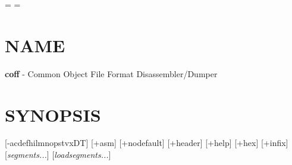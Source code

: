 \def\headnote#1{\setbox0=\hbox{\bf #1\enspace}
                \hangindent\parindent
                \advance\hangindent by 5pc
                \advance\hangindent by\wd0
                \indent\hbox to5pc{\hfil}\box0}
\def\body#1#2{\setbox0=\hbox to6pc{\omf #1\hfil}
                \setbox1=\hbox to5pc{#2\hfil}
                \hangindent\parindent
                \advance\hangindent by 11pc
                \indent\box0\box1}
\def\bodybody{\hangindent\parindent
                \advance\hangindent by 11pc
                \indent\hbox to11pc{\hfil}}
\def\bodynote#1{\setbox0=\hbox{\bf #1\enspace}
                \hangindent\parindent
                \advance\hangindent by 11pc
                \advance\hangindent by\wd0
                \indent\hbox to11pc{\hfil}\box0}
\def\beginsample{\begingroup
                \obeylines\obeyspaces
                \parskip=0pt\baselineskip=10pt\sample
                \catcode`\$=11  %
                \catcode`\_=11  %
                \catcode`\#=11  %
                \catcode`\~=11}
\def\endsample{\catcode`\$=3    %
                \catcode`\_=8   %
                \catcode`\#=6   %
                \catcode`\~=\active %
                \endgroup}

%
\headline={}
\footline={\vbox{\vskip4pc
                }}
\topskip=4pc
\vsize=8.6in

%
\rm\bigskip\bigskip

\section{NAME}

{\bf coff} - Common Object File Format Disassembler/Dumper

\bigskip

\section{SYNOPSIS}

 [-acdefhilmnopstvxDT] [+asm] [+nodefault] [+header]
[+help] [+hex] [+infix] [{\it segments...}] [{\it loadsegments...}]

